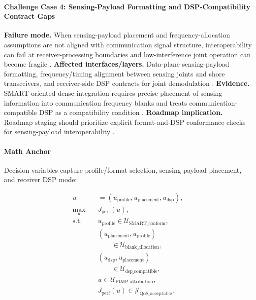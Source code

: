 \documentclass[letterpaper,journal]{IEEEtran}
\begin{document}
\paragraph{Challenge Case 4: Sensing-Payload Formatting and DSP-Compatibility Contract Gaps}
\textbf{Failure mode.} When sensing-payload placement and frequency-allocation assumptions are not aligned with communication signal structure, interoperability can fail at receiver-processing boundaries and low-interference joint operation can become fragile \cite{O_ISAC_220}. \textbf{Affected interfaces/layers.} Data-plane sensing-payload formatting, frequency/timing alignment between sensing joints and shore transceivers, and receiver-side DSP contracts for joint demodulation \cite{O_ISAC_220}. \textbf{Evidence.} SMART-oriented dense integration requires precise placement of sensing information into communication frequency blanks and treats communication-compatible DSP as a compatibility condition \cite{O_ISAC_220}. \textbf{Roadmap implication.} Roadmap staging should prioritize explicit format-and-DSP conformance checks for sensing-payload interoperability \cite{O_ISAC_220}.

\paragraph{Math Anchor}
Decision variables capture profile/format selection, sensing-payload placement, and receiver DSP mode:

\begin{equation}
    \begin{aligned}
        u             & = (u_{\mathrm{profile}},u_{\mathrm{placement}},u_{\mathrm{dsp}}), \\
        \max_{u}\quad & J_{\mathrm{perf}}(u),                                             \\
        \text{s.t.}\quad
                      & u_{\mathrm{profile}} \in \mathcal{U}_{\mathrm{SMART\_conform}},   \\
                      & (u_{\mathrm{placement}},u_{\mathrm{profile}})                     \\
                      & \qquad \in \mathcal{U}_{\mathrm{blank\_allocation}},              \\
                      & (u_{\mathrm{dsp}},u_{\mathrm{placement}})                         \\
                      & \qquad \in \mathcal{U}_{\mathrm{dsp\_compatible}},                \\
                      & u \in \mathcal{U}_{\mathrm{PtMP\_attribution}},                   \\
                      & J_{\mathrm{perf}}(u) \in \mathcal{J}_{\mathrm{QoS\_acceptable}}.
    \end{aligned}
\end{equation}
\end{document}

